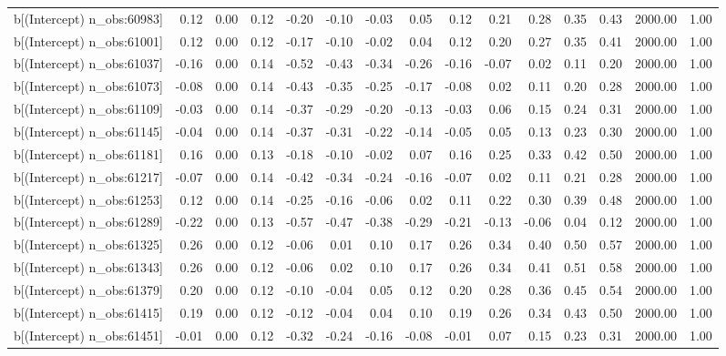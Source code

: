 \begin{table}[ht]
\begin{tabular}{rrrrrrrrrrrrrrr}
  b[(Intercept) n\_obs:60983] & 0.12 & 0.00 & 0.12 & -0.20 & -0.10 & -0.03 & 0.05 & 0.12 & 0.21 & 0.28 & 0.35 & 0.43 & 2000.00 & 1.00 \\ 
  b[(Intercept) n\_obs:61001] & 0.12 & 0.00 & 0.12 & -0.17 & -0.10 & -0.02 & 0.04 & 0.12 & 0.20 & 0.27 & 0.35 & 0.41 & 2000.00 & 1.00 \\ 
  b[(Intercept) n\_obs:61037] & -0.16 & 0.00 & 0.14 & -0.52 & -0.43 & -0.34 & -0.26 & -0.16 & -0.07 & 0.02 & 0.11 & 0.20 & 2000.00 & 1.00 \\ 
  b[(Intercept) n\_obs:61073] & -0.08 & 0.00 & 0.14 & -0.43 & -0.35 & -0.25 & -0.17 & -0.08 & 0.02 & 0.11 & 0.20 & 0.28 & 2000.00 & 1.00 \\ 
  b[(Intercept) n\_obs:61109] & -0.03 & 0.00 & 0.14 & -0.37 & -0.29 & -0.20 & -0.13 & -0.03 & 0.06 & 0.15 & 0.24 & 0.31 & 2000.00 & 1.00 \\ 
  b[(Intercept) n\_obs:61145] & -0.04 & 0.00 & 0.14 & -0.37 & -0.31 & -0.22 & -0.14 & -0.05 & 0.05 & 0.13 & 0.23 & 0.30 & 2000.00 & 1.00 \\ 
  b[(Intercept) n\_obs:61181] & 0.16 & 0.00 & 0.13 & -0.18 & -0.10 & -0.02 & 0.07 & 0.16 & 0.25 & 0.33 & 0.42 & 0.50 & 2000.00 & 1.00 \\ 
  b[(Intercept) n\_obs:61217] & -0.07 & 0.00 & 0.14 & -0.42 & -0.34 & -0.24 & -0.16 & -0.07 & 0.02 & 0.11 & 0.21 & 0.28 & 2000.00 & 1.00 \\ 
  b[(Intercept) n\_obs:61253] & 0.12 & 0.00 & 0.14 & -0.25 & -0.16 & -0.06 & 0.02 & 0.11 & 0.22 & 0.30 & 0.39 & 0.48 & 2000.00 & 1.00 \\ 
  b[(Intercept) n\_obs:61289] & -0.22 & 0.00 & 0.13 & -0.57 & -0.47 & -0.38 & -0.29 & -0.21 & -0.13 & -0.06 & 0.04 & 0.12 & 2000.00 & 1.00 \\ 
  b[(Intercept) n\_obs:61325] & 0.26 & 0.00 & 0.12 & -0.06 & 0.01 & 0.10 & 0.17 & 0.26 & 0.34 & 0.40 & 0.50 & 0.57 & 2000.00 & 1.00 \\ 
  b[(Intercept) n\_obs:61343] & 0.26 & 0.00 & 0.12 & -0.06 & 0.02 & 0.10 & 0.17 & 0.26 & 0.34 & 0.41 & 0.51 & 0.58 & 2000.00 & 1.00 \\ 
  b[(Intercept) n\_obs:61379] & 0.20 & 0.00 & 0.12 & -0.10 & -0.04 & 0.05 & 0.12 & 0.20 & 0.28 & 0.36 & 0.45 & 0.54 & 2000.00 & 1.00 \\ 
  b[(Intercept) n\_obs:61415] & 0.19 & 0.00 & 0.12 & -0.12 & -0.04 & 0.04 & 0.10 & 0.19 & 0.26 & 0.34 & 0.43 & 0.50 & 2000.00 & 1.00 \\ 
  b[(Intercept) n\_obs:61451] & -0.01 & 0.00 & 0.12 & -0.32 & -0.24 & -0.16 & -0.08 & -0.01 & 0.07 & 0.15 & 0.23 & 0.31 & 2000.00 & 1.00 \\ 

\end{tabular}
\end{table}
